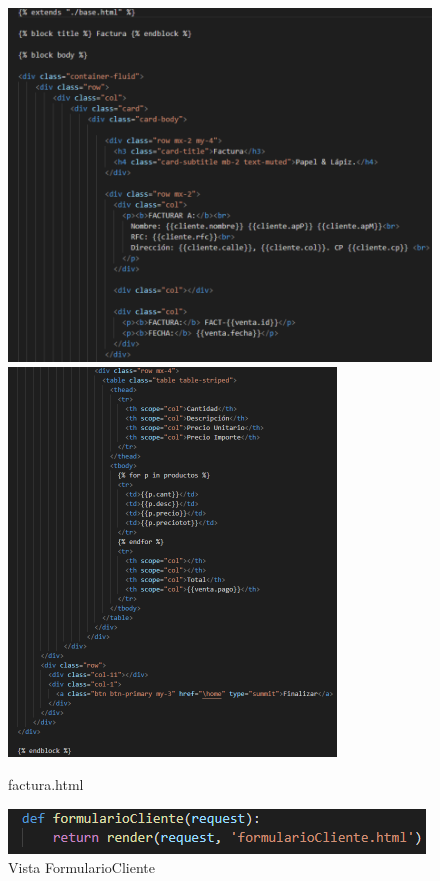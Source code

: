 \documentclass[12pt,letterpaper]{article}
\begin{document}
	\begin{figure}[H]
		\centering
		\includegraphics[scale=0.60]{Documentacion/img/lineasFactura.png}
		\includegraphics[scale=0.70]{Documentacion/img/lineasFactura2.png}
		\caption{factura.html}
	\end{figure}
	
	\begin{figure}[H]
		\centering
		\includegraphics[scale=0.70]{Documentacion/img/def_FormularioCliene.png}
		\caption{Vista FormularioCliente}
	\end{figure}
	
\end{document}
